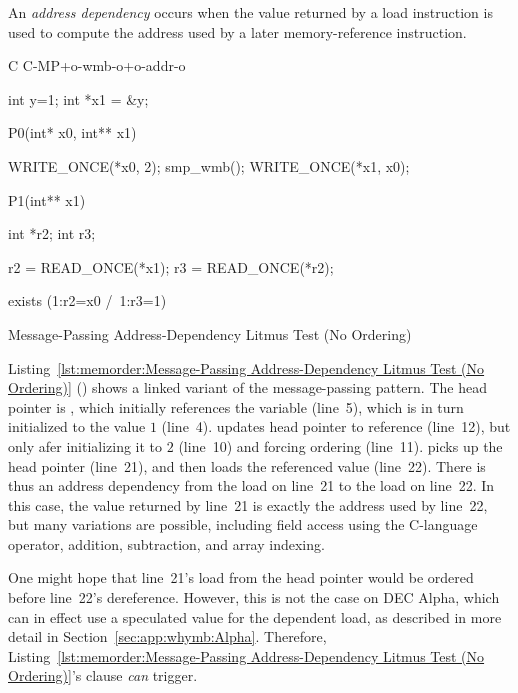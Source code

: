 An \emph{address dependency} occurs when the value returned by a load
instruction is used to compute the address used by a later memory-reference
instruction.

\begin{listing}[tbp]
{ \scriptsize
\begin{verbbox}[\LstLineNo]
C C-MP+o-wmb-o+o-addr-o

{
int y=1;
int *x1 = &y;
}

P0(int* x0, int** x1) {

  WRITE_ONCE(*x0, 2);
  smp_wmb();
  WRITE_ONCE(*x1, x0);

}

P1(int** x1) {

  int *r2;
  int r3;

  r2 = READ_ONCE(*x1);
  r3 = READ_ONCE(*r2);

}

exists (1:r2=x0 /\ 1:r3=1)
\end{verbbox}
}
\centering
\theverbbox
\caption{Message-Passing Address-Dependency Litmus Test (No Ordering)}
\label{lst:memorder:Message-Passing Address-Dependency Litmus Test (No Ordering)}
\end{listing}

Listing~\ref{lst:memorder:Message-Passing Address-Dependency Litmus Test (No Ordering)}
()
shows a linked variant of the message-passing pattern.
The head pointer is , which initially
references the  variable  (line~5), which is in turn 
initialized to the value $1$ (line~4).
 updates head pointer  to reference  (line~12),
but only afer initializing it to $2$ (line~10) and forcing ordering
(line~11).
 picks up the head pointer  (line~21), and then loads
the referenced value (line~22).
There is thus an address dependency from the load on line~21 to the
load on line~22.
In this case, the value returned by line~21 is exactly the address
used by line~22, but many variations are possible,
including field access using the C-language \co{->} operator,
addition, subtraction, and array indexing.

One might hope that line~21's load from the head pointer would be ordered
before line~22's dereference.
However, this is not the case on DEC Alpha, which can in effect use
a speculated value for the dependent load, as described in more detail in
Section~\ref{sec:app:whymb:Alpha}.
Therefore,
Listing~\ref{lst:memorder:Message-Passing Address-Dependency Litmus Test (No Ordering)}'s
 clause \emph{can} trigger.

